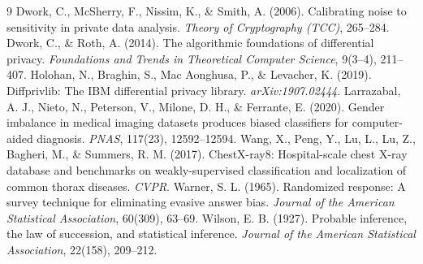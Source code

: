 \documentclass[11pt]{article}
\begin{document}
\begin{thebibliography}{9}
 Dwork, C., McSherry, F., Nissim, K., \& Smith, A. (2006). Calibrating noise to sensitivity in private data analysis. \emph{Theory of Cryptography (TCC)}, 265--284.
 Dwork, C., \& Roth, A. (2014). The algorithmic foundations of differential privacy. \emph{Foundations and Trends in Theoretical Computer Science}, 9(3--4), 211--407.
 Holohan, N., Braghin, S., Mac Aonghusa, P., \& Levacher, K. (2019). Diffprivlib: The IBM differential privacy library. \emph{arXiv:1907.02444}.
 Larrazabal, A. J., Nieto, N., Peterson, V., Milone, D. H., \& Ferrante, E. (2020). Gender imbalance in medical imaging datasets produces biased classifiers for computer-aided diagnosis. \emph{PNAS}, 117(23), 12592--12594.
 Wang, X., Peng, Y., Lu, L., Lu, Z., Bagheri, M., \& Summers, R. M. (2017). ChestX-ray8: Hospital-scale chest X-ray database and benchmarks on weakly-supervised classification and localization of common thorax diseases. \emph{CVPR}.
 Warner, S. L. (1965). Randomized response: A survey technique for eliminating evasive answer bias. \emph{Journal of the American Statistical Association}, 60(309), 63--69.
 Wilson, E. B. (1927). Probable inference, the law of succession, and statistical inference. \emph{Journal of the American Statistical Association}, 22(158), 209--212.
\end{thebibliography}
\end{document}
